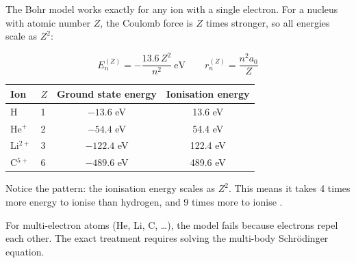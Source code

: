 \documentclass[12pt, a4paper]{book}
\begin{document}
The Bohr model works exactly for any ion with a single electron.
For a nucleus with atomic number $Z$, the Coulomb force
is $Z$ times stronger, so all energies scale as $Z^2$:

\[
  E_n^{(Z)} = -\frac{13.6\, Z^2}{n^2}\ \text{eV}
  \qquad
  r_n^{(Z)} = \frac{n^2 a_0}{Z}
\]

\begin{center}
\begin{tabular}{llcc}
\toprule
Ion & $Z$ & Ground state energy & Ionisation energy \\
\midrule
H    & 1 & $-13.6$ eV & 13.6 eV \\
He$^+$ & 2 & $-54.4$ eV & 54.4 eV \\
Li$^{2+}$ & 3 & $-122.4$ eV & 122.4 eV \\
C$^{5+}$ & 6 & $-489.6$ eV & 489.6 eV \\
\bottomrule
\end{tabular}
\end{center}

\vspace{0.5em}

Notice the pattern: the ionisation energy scales as $Z^2$.
This means it takes 4 times more energy to ionise 
than hydrogen, and 9 times more to ionise .

For multi-electron atoms (He, Li, C, \ldots), the model
fails because electrons repel each other.
The exact treatment requires solving the multi-body
Schr\"{o}dinger equation.
\end{document}
